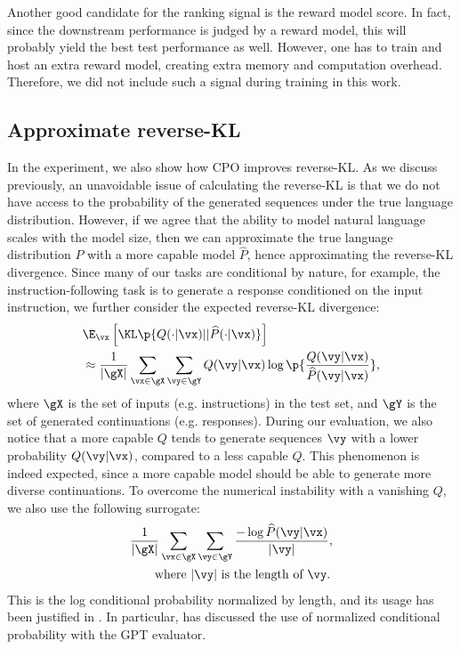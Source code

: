 Another good candidate for the ranking signal is the reward model score. In fact, since the downstream performance is judged by a reward model, this will probably yield the best test performance as well. However, one has to train and host an extra reward model, creating extra memory and computation overhead. Therefore, we did not include such a signal during training in this work.

\subsection{Approximate reverse-KL}\label{subsec:approx_reverse_kl}
In the experiment, we also show how CPO improves reverse-KL. As we discuss previously, an unavoidable issue of calculating the reverse-KL is that we do not have access to the probability of the generated sequences under the true language distribution. However, if we agree that the ability to model natural language scales with the model size, then we can approximate the true language distribution $P$ with a more capable model $\widehat P$, hence approximating the reverse-KL divergence. Since many of our tasks are conditional by nature, for example, the instruction-following task is to generate a response conditioned on the input instruction, we further consider the expected reverse-KL divergence:
\begin{align}\label{eq:reversekl}
\begin{split}
		&\E_\vx\left[\KL\p{Q(\cdot|\vx)||\widehat P(\cdot|\vx)}\right] \\
		&\approx \frac{1}{|\gX|}\sum_{\vx\in\gX}\sum_{\vy\in \gY}Q(\vy|\vx)\log\p{\frac{Q(\vy|\vx)}{\widehat P(\vy|\vx)}},
\end{split}
\end{align}
where $\gX$ is the set of inputs (e.g. instructions) in the test set, and $\gY$ is the set of generated continuations (e.g. responses).
During our evaluation, we also notice that a more capable $Q$ tends to generate sequences $\vy$ with a lower probability $Q(\vy|\vx)$, compared to a less capable $Q$. This phenomenon is indeed expected, since a more capable model should be able to generate more diverse continuations. To overcome the numerical instability with a vanishing $Q$, we also use the following surrogate: 
\begin{align}\label{eq:condprob}
\begin{split}
		&\frac{1}{|\gX|}\sum_{\vx\in\gX}\sum_{\vy\in \gY}\frac{-\log\widehat P(\vy|\vx)}{|\vy|}, \\
		&\qquad \text{where } |\vy| \text{ is the length of $\vy$.}
\end{split}
\end{align}
This is the log conditional probability normalized by length, and its usage has been justified in \citet{cho2014properties,liu2022brio,fu2023gptscore}. In particular, \citet{fu2023gptscore} has discussed the use of normalized conditional probability with the GPT evaluator.

 